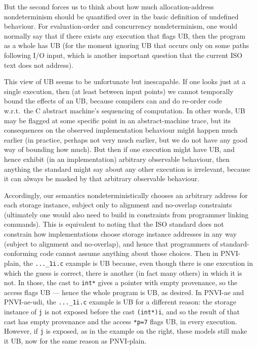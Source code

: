 \documentclass[acmsmall,review,screen]{acmart}\settopmatter{printfolios=true,printccs=false,printacmref=false}
\begin{document}
But the second forces us to think about how much allocation-address
nondeterminism should be quantified over in the basic definition of
undefined behaviour. For evaluation-order and concurrency
nondeterminism, one would normally say that if there exists any execution
that flags UB, then the program as a whole has UB (for the moment
ignoring UB that occurs only on some paths following I/O input, which
is another important question that the current ISO text does not address).  

This view of UB seems to be unfortunate but inescapable. 
If one looks just at a single execution, then 
 (at least between input points) we cannot
temporally bound the effects of an UB, because compilers can and do
re-order code w.r.t.~the C abstract machine's sequencing of
computation.  In other words, UB may be flagged at some specific point
in an abstract-machine trace, but its consequences on the observed
implementation behaviour might happen much earlier (in practice,
perhaps not very much earlier, but we do not have any good way of
bounding how much).
%
But then if one execution might have UB, and hence exhibit (in an
implementation) arbitrary observable behaviour, then anything the
standard might say about any other execution is irrelevant, because it
can always be masked by that arbitrary observable behaviour.

Accordingly, our semantics nondeterministically chooses an arbitrary
address for each storage instance, subject only to alignment and no-overlap
constraints (ultimately one would also need to build in constraints
from programmer linking commands).
%
This is equivalent to noting that the ISO standard does not constrain
how implementations choose storage instance addresses in any way (subject to
alignment and no-overlap), and hence that programmers of
standard-conforming code cannot assume anything about those choices.
%
Then in PNVI-plain, the \lstinline{..._1i.c} example is UB because, even
though there is one execution in which the guess is correct, there is
another (in fact many others) in which it is not. In those, the cast
to \lstinline{int*} gives a pointer with empty provenance, so the
access flags UB --- hence the whole program is UB, as desired.
%
In PNVI-ae and PNVI-ae-udi, the \lstinline{..._1i.c} example is UB for
a different reason: the storage instance of \lstinline{j} is not
exposed before the cast \lstinline{(int*)i}, and so the result of that
cast has empty provenance and the access \lstinline{*p=7} flags UB, in every execution. 
%
However, if \lstinline{j} is exposed, as in the example on the right,
these models still make it UB, now for the same reason as PNVI-plain.
\end{document}
